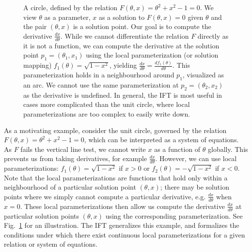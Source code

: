 \documentclass[11pt]{article}
\begin{document}
\begin{figure}
\centering
{}
\caption{
\label{fig:circle}
A circle, defined by the relation $F(\theta,x) = \theta^2 + x^2 - 1 = 0$.
We view $\theta$ as a parameter, $x$ as a solution to $F(\theta,x)=0$ given $\theta$
and the pair $(\theta,x)$ is a solution point.
Our goal is to compute the derivative $\frac{dx}{d\theta}$.
While we cannot differentiate the relation $F$ directly as it is not a function,
we can compute the derivative at the solution point $p_1 = (\theta_1,x_1)$
using the local parameterization (or solution mapping) $f_1(\theta)=\sqrt{1-x^2}$,
yielding $\frac{dx}{d\theta}= \frac{df_1(\theta)}{d\theta}$.
This parameterization holds
in a neighbourhood around $p_1$, visualized as an arc.
We cannot use the same parameterization at $p_2 = (\theta_2, x_2)$ as the derivative is undefined.
In general, the IFT is most useful in cases more complicated than the unit circle,
where local parameterizations are too complex to easily write down.
}
\end{figure}

As a motivating example, consider the unit circle,
governed by the relation $F(\theta,x) = \theta^2 + x^2 - 1 = 0$,
which can be interpreted as a system of equations.
As $F$ fails the vertical line test, we cannot write $x$ as a function of $\theta$ globally.
This prevents us from taking derivatives, for example $\frac{dx}{d\theta}$.
However, we can use local parameterizations: $f_1(\theta) = \sqrt{1-x^2}$ if $x > 0$
or $f_2(\theta) = -\sqrt{1-x^2}$ if $x<0$.
Note that the local parameterizations are functions that hold
only within a neighbourhood of a particular solution point $(\theta,x)$;
there may be solution points where we simply cannot compute a particular derivative,
e.g. $\frac{dx}{d\theta}$ when $x=0$.
These local parameterizations then allow us compute the derivative $\frac{dx}{d\theta}$
at particular solution points $(\theta,x)$ using the corresponding parameterization.
See Fig.~\ref{fig:circle} for an illustration.
The IFT generalizes this example, and formalizes the conditions under which there exist
continuous local parameterizations for a given relation or system of equations.
\end{document}
